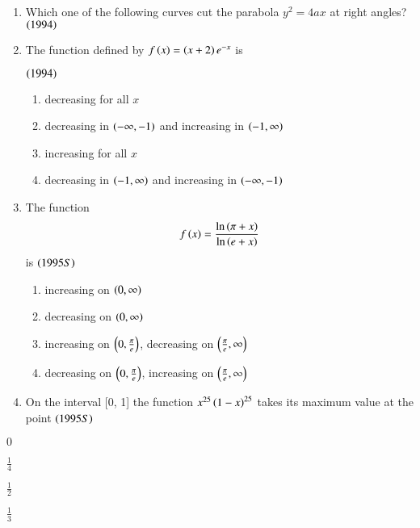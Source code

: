 \documentclass[journal,12pt,twocolumn]{IEEEtran}
\theoremstyle{remark}
\begin{document}
\begin{enumerate}
\item Which one of the following curves cut the parabola
$y^2 = 4ax$ at right angles?
\hfill$\left(1994\right)$
\begin{enumerate}
\end{enumerate}

\item The function defined by 
$f\left(x\right) = \left(x+2\right)e^{-x}$ is

\hfill$\left(1994\right)$
\begin{enumerate}
	\item decreasing for all $x$
	\item decreasing in $\left(-\infty, -1\right)$ and increasing
		in $\left(-1, \infty\right)$
        \item increasing for all $x$
	\item decreasing in $\left(-1, \infty\right)$ and increasing
		in $\left(-\infty, -1\right)$
\end{enumerate}

\item The function 
\begin{align*}
		f\left(x\right) =\frac{\ln \left(\pi + x\right)}{\ln \left(e + x\right)}
\end{align*} is
\hfill$\left(1995S\right)$

\begin{enumerate}
	\item increasing on $\left(0, \infty\right)$
	\item decreasing on $\left(0, \infty\right)$
	\item increasing on $\left(0, \frac{\pi}{e}\right)$,
		decreasing on $\left(\frac{\pi}{e}, \infty\right)$
	\item decreasing on $\left(0, \frac{\pi}{e}\right)$,
		increasing on $\left(\frac{\pi}{e}, \infty\right)$
\end{enumerate}

\item On the interval [0, 1] the function $x^{25}\left(1-x\right)^{25}$
takes its maximum value at the point 
\hfill$\left(1995S\right)$
\end{enumerate}

\begin{enumerate}
\begin{multicols}{4}
	\item $0$ 
	\item $\frac{1}{4}$ 
	\item $\frac{1}{2}$ 
        \item $\frac{1}{3}$
\end{multicols}
\end{enumerate}

\newpage
\bigskip
\renewcommand{\thefigure}
{\theenumi}
\renewcommand{\thetable}
{\theenumi}
\end{document}
